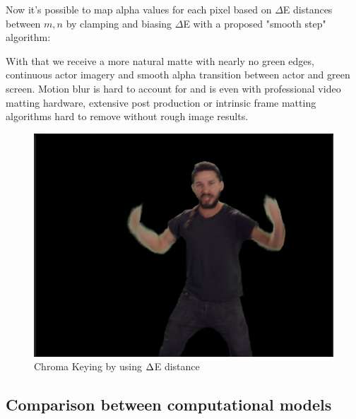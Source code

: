 Now it's possible to map alpha values for each pixel based on $\Delta$E 
distances between $m, n$ by clamping and biasing $\Delta$E with a proposed 
"smooth step" algorithm:




With that we receive a more natural matte with nearly no green edges, 
continuous actor imagery and smooth alpha transition between actor and green 
screen. Motion blur is hard to account for and is even with professional video 
matting hardware, extensive post production or intrinsic frame matting 
algorithms hard to remove without rough image results. 

\begin{figure}[htb]
	\includegraphics[width=\textwidth]{_raw_resources/Comparison_DeltaE_color.png}
	\caption{Chroma Keying by using $\protect\Delta $E distance}
	\label{fig:chroma:deltae}
\end{figure}

\subsection{Comparison between computational models}

